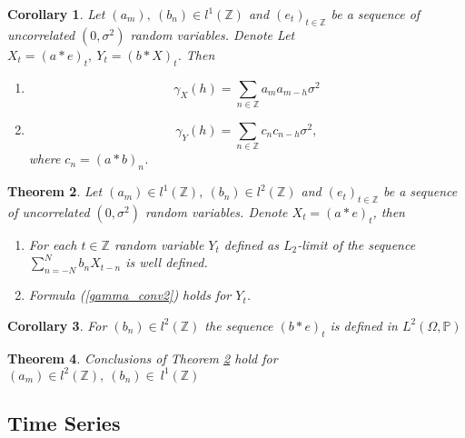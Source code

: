 \documentclass[12pt]{article}
\newtheorem{theorem}{Theorem}[section]
\newtheorem{corollary}[theorem]{Corollary}
\theoremstyle{definition}
\theoremstyle{remark}
\numberwithin{equation}{section}
\newcommand{\PP}{\mathbb{P}}
\newcommand{\ZZ}{\mathbb{Z}}
\begin{document}
\begin{corollary}
	 Let $(a_m),\ (b_n)\in l^1(\ZZ)$ and $(e_t)_{t\in\ZZ}$ be a sequence of uncorrelated $(0, \sigma^2)$ random variables. Denote Let $X_t = (a*e)_t,\ Y_t = (b*X)_t$. Then
	\begin{enumerate}
		\item
		\begin{equation*}\label{gamma_conv1}
			\gamma_X(h) = \sum_{n\in\ZZ}a_ma_{m-h}\sigma^2
		\end{equation*}
		\item
		\begin{equation}\label{gamma_conv2}
			\gamma_Y(h) = \sum_{n\in\ZZ}c_nc_{n-h}\sigma^2,
		\end{equation}
	where $c_n = (a*b)_n$.
	\end{enumerate}
\end{corollary}

\begin{theorem}\label{convl1l2}
	Let $(a_m)\in l^1(\ZZ),\ (b_n)\in l^2(\ZZ)$ and $(e_t)_{t\in\ZZ}$ be a sequence of uncorrelated $(0, \sigma^2)$ random variables. Denote $X_t = (a*e)_t$, then
	\begin{enumerate}
		\item For each $t\in\ZZ$ random variable $Y_t$ defined as $L_2$-limit of the sequence $\sum_{n = - N}^Nb_nX_{t-n}$ is well defined.
		\item  Formula (\ref{gamma_conv2}) holds for $Y_t$.
	\end{enumerate}
\end{theorem}

\begin{corollary}
	For $(b_n)\in l^2(\ZZ)$ the sequence $(b*e)_t$ is defined in $L^2(\Omega, \PP)$
\end{corollary}

\begin{theorem}
	Conclusions of Theorem \ref{convl1l2} hold for $(a_m)\in l^2(\ZZ),\ (b_n)\in~l^1(\ZZ)$
\end{theorem}



\subsection{Time Series}
\end{document}
